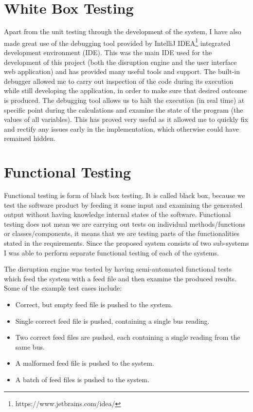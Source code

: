 \section{White Box Testing}
Apart from the unit testing through the development of the system, I have also made great use of the debugging tool provided by IntelliJ IDEA\footnote{https://www.jetbrains.com/idea/} integrated development environment (IDE). This was the main IDE used for the development of this project (both the disruption engine and the user interface web application) and has provided many useful tools and support. The built-in debugger allowed me to carry out inspection of the code during its execution while still developing the application, in order to make sure that desired outcome is produced. The debugging tool allows us to halt the execution (in real time) at specific point during the calculations and examine the state of the program (the values of all variables). This has proved very useful as it allowed me to quickly fix and rectify any issues early in the implementation, which otherwise could have remained hidden.

\section{Functional Testing}
Functional testing is form of black box testing. It is called black box, because we test the software product by feeding it some input and examining the generated output without having knowledge internal states of the software. Functional testing does not mean we are carrying out tests on individual methods/functions or classes/components, it means that we are testing parts of the functionalities stated in the requirements. Since the proposed system consists of two sub-systems I was able to perform separate functional testing of each of the systems.

The disruption engine was tested by having semi-automated functional tests which feed the system with a feed file and then examine the produced results. Some of the example test cases include:
\begin{itemize}
	\item Correct, but empty feed file is pushed to the system.
	\item Single correct feed file is pushed, containing a single bus reading.
	\item Two correct feed files are pushed, each containing a single reading from the same bus.
	\item A malformed feed file is pushed to the system.
	\item A batch of feed files is pushed to the system.
\end{itemize}

